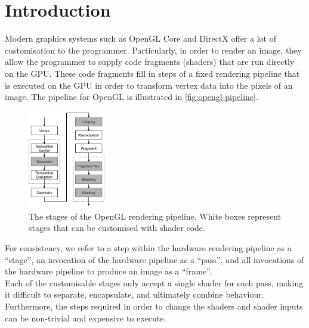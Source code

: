 \documentclass[format=sigconf]{acmart}
\begin{document}

\maketitle

\newpage

\def\abovecaptionskip{1pt}
\def\listingautorefname{listing}
\def\figureautorefname{figure}

\section{Introduction}\label{introduction}
Modern graphics systems such as OpenGL Core and DirectX offer a lot of customisation to the programmer. Particularly, in order to render an image, they allow the programmer to supply code fragments (shaders) that are run directly on the GPU. These code fragments fill in steps of a fixed rendering pipeline that is executed on the GPU in order to transform vertex data into the pixels of an image. The pipeline for OpenGL is illustrated in \autoref{fig:opengl-pipeline}. \\

\begin{figure}[h]
  \begin{center}
    \includegraphics[width=0.3\textwidth]{opengl-pipeline.png}
  \end{center}
  \caption{The stages of the OpenGL rendering pipeline. White boxes represent stages that can be customised with shader code.}
  \label{fig:opengl-pipeline}
\end{figure}

For consistency, we refer to a step within the hardware rendering pipeline as a ``stage'', an invocation of the hardware pipeline as a ``pass'', and all invocations of the hardware pipeline to produce an image as a ``frame''. \\

Each of the customisable stages only accept a single shader for each pass, making it difficult to separate, encapsulate, and ultimately combine behaviour. Furthermore, the steps required in order to change the shaders and shader inputs can be non-trivial and expensive to execute. \\
\end{document}
